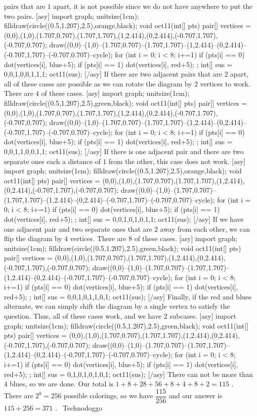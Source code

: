 \documentclass[12pt]{article}
\begin{document}
pairs that are $1$ apart, it is not possible since we do not have anywhere to put the two pairs. [asy] import graph; unitsize(1cm); filldraw(circle((0.5,1.207),2.5),orange,black); void oct11(int[] pts) { pair[] vertices = {(0,0),(1,0),(1.707,0.707),(1.707,1.707),(1,2.414),(0,2.414),(-0.707,1.707),(-0.707,0.707)}; draw((0,0)--(1,0)--(1.707,0.707)--(1.707,1.707)--(1,2.414)--(0,2.414)--(-0.707,1.707)--(-0.707,0.707)--cycle); for (int i = 0; i < 8; i+=1) { if (pts[i] == 0) { dot(vertices[i], blue+5); } if (pts[i] == 1) { dot(vertices[i], red+5); } } }; int[] sus = {0,0,1,0,0,1,1,1}; oct11(sus); [/asy] If there are two adjacent pairs that are $2$ apart, all of these cases are possible as we can rotate the diagram by $2$ vertices to work. There are $4$ of these cases. [asy] import graph; unitsize(1cm); filldraw(circle((0.5,1.207),2.5),green,black); void oct11(int[] pts) { pair[] vertices = {(0,0),(1,0),(1.707,0.707),(1.707,1.707),(1,2.414),(0,2.414),(-0.707,1.707),(-0.707,0.707)}; draw((0,0)--(1,0)--(1.707,0.707)--(1.707,1.707)--(1,2.414)--(0,2.414)--(-0.707,1.707)--(-0.707,0.707)--cycle); for (int i = 0; i < 8; i+=1) { if (pts[i] == 0) { dot(vertices[i], blue+5); } if (pts[i] == 1) { dot(vertices[i], red+5); } } }; int[] sus = {0,0,1,1,0,0,1,1}; oct11(sus); [/asy] If there is one adjacent pair and there are two separate ones each a distance of $1$ from the other, this case does not work. [asy] import graph; unitsize(1cm); filldraw(circle((0.5,1.207),2.5),orange,black); void oct11(int[] pts) { pair[] vertices = {(0,0),(1,0),(1.707,0.707),(1.707,1.707),(1,2.414),(0,2.414),(-0.707,1.707),(-0.707,0.707)}; draw((0,0)--(1,0)--(1.707,0.707)--(1.707,1.707)--(1,2.414)--(0,2.414)--(-0.707,1.707)--(-0.707,0.707)--cycle); for (int i = 0; i < 8; i+=1) { if (pts[i] == 0) { dot(vertices[i], blue+5); } if (pts[i] == 1) { dot(vertices[i], red+5); } } }; int[] sus = {0,0,1,0,1,0,1,1}; oct11(sus); [/asy] If we have one adjacent pair and two separate ones that are $2$ away from each other, we can flip the diagram by $4$ vertices. There are $8$ of these cases. [asy] import graph; unitsize(1cm); filldraw(circle((0.5,1.207),2.5),green,black); void oct11(int[] pts) { pair[] vertices = {(0,0),(1,0),(1.707,0.707),(1.707,1.707),(1,2.414),(0,2.414),(-0.707,1.707),(-0.707,0.707)}; draw((0,0)--(1,0)--(1.707,0.707)--(1.707,1.707)--(1,2.414)--(0,2.414)--(-0.707,1.707)--(-0.707,0.707)--cycle); for (int i = 0; i < 8; i+=1) { if (pts[i] == 0) { dot(vertices[i], blue+5); } if (pts[i] == 1) { dot(vertices[i], red+5); } } }; int[] sus = {0,0,1,0,1,1,0,1}; oct11(sus); [/asy] Finally, if the red and blues alternate, we can simply shift the diagram by a single vertex to satisfy the question. Thus, all of these cases work, and we have $2$ subcases. [asy] import graph; unitsize(1cm); filldraw(circle((0.5,1.207),2.5),green,black); void oct11(int[] pts) { pair[] vertices = {(0,0),(1,0),(1.707,0.707),(1.707,1.707),(1,2.414),(0,2.414),(-0.707,1.707),(-0.707,0.707)}; draw((0,0)--(1,0)--(1.707,0.707)--(1.707,1.707)--(1,2.414)--(0,2.414)--(-0.707,1.707)--(-0.707,0.707)--cycle); for (int i = 0; i < 8; i+=1) { if (pts[i] == 0) { dot(vertices[i], blue+5); } if (pts[i] == 1) { dot(vertices[i], red+5); } } }; int[] sus = {0,1,0,1,0,1,0,1}; oct11(sus); [/asy] There can not be more than $4$ blues, so we are done. Our total is $1+8+28+56+8+4+8+2=115$ . There are $2^8=256$ possible colorings, so we have $\dfrac{115}{256}$ and our answer is $115+256=\boxed{371}$ . ~Technodoggo
\end{document}
